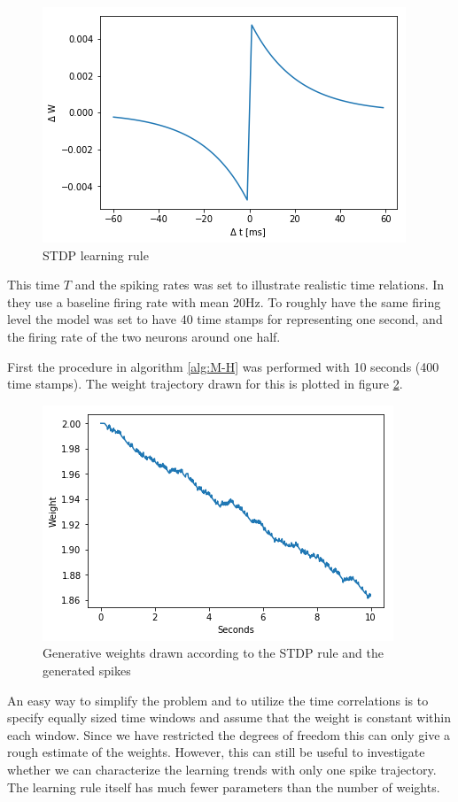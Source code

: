 \begin{figure}[hbt!]
\caption{STDP learning rule}
\label{fig:LR}
    \centering
    \includegraphics[scale=0.8]{fig/Learning_rule2.png}
\end{figure}

This time $T$ and the spiking rates was set to illustrate realistic time relations. In \cite{Linderman} they use a baseline firing rate with mean 20Hz. To roughly have the same firing level the model was set to have 40 time stamps for representing one second, and the firing rate of the two neurons around one half. 

First the procedure in algorithm \ref{alg:M-H} was performed with 10 seconds (400 time stamps). The weight trajectory drawn for this is plotted in figure \ref{fig:w_STDP}. 


\begin{figure}[hbt!]
\caption{Generative weights drawn according to the STDP rule and the generated spikes}
\label{fig:w_STDP}
    \centering
    \includegraphics[scale=0.8]{fig/LR_underllying.png}
\end{figure}

An easy way to simplify the problem and to utilize the time correlations is to specify equally sized time windows and assume that the weight is constant within each window. Since we have restricted the degrees of freedom this can only give a rough estimate of the weights. However, this can still be useful to investigate whether we can characterize the learning trends with only one spike trajectory. The learning rule itself has much fewer parameters than the number of weights. 



